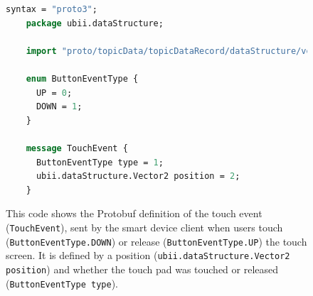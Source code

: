 \begin{figure}[H]
	\begin{lstlisting}[language=Protobuf]
    syntax = "proto3";
    package ubii.dataStructure;
    
    import "proto/topicData/topicDataRecord/dataStructure/vector2.proto";
    
    enum ButtonEventType {
      UP = 0;
      DOWN = 1;
    }

    message TouchEvent {
      ButtonEventType type = 1;
      ubii.dataStructure.Vector2 position = 2;
    }
  \end{lstlisting}
	\caption[Protobuf definition of the touch event]{This code shows the \gls{Protobuf} definition of the touch event (\lstinline{TouchEvent}), sent by the smart device client when users touch (\lstinline{ButtonEventType.DOWN}) or release (\lstinline{ButtonEventType.UP}) the touch screen. It is defined by a position (\lstinline{ubii.dataStructure.Vector2 position}) and whether the touch pad was touched or released (\lstinline{ButtonEventType type}).}\label{fig:ubii-event-type}
\end{figure}
